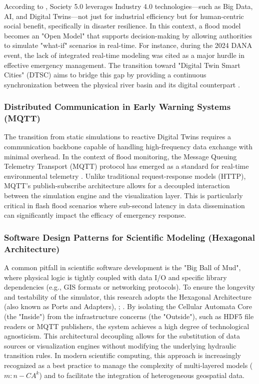 According to \cite{FonsecaiCasas2026}, Society 5.0 leverages Industry 4.0 technologies—such as Big Data, AI, and Digital 
Twins—not just for industrial efficiency but for human-centric social benefit, specifically in disaster resilience. In this 
context, a flood model becomes an "Open Model" that supports decision-making by allowing authorities to simulate "what-if" 
scenarios in real-time. For instance, during the 2024 DANA event, the lack of integrated real-time modeling was cited as a 
major hurdle in effective emergency management. The transition toward "Digital Twin Smart Cities" (DTSC) 
aims to bridge this gap by providing a continuous synchronization between the physical river basin and its digital counterpart 
\parencite{Mazzetto2024}.


\subsubsection{Distributed Communication in Early Warning Systems (MQTT)}

The transition from static simulations to reactive Digital Twins requires a communication backbone capable of handling high-frequency 
data exchange with minimal overhead. In the context of flood monitoring, the Message Queuing Telemetry Transport (MQTT) protocol has 
emerged as a standard for real-time environmental telemetry \parencite{Dionsio2025}. Unlike traditional request-response models (HTTP), 
MQTT's publish-subscribe architecture allows for a decoupled interaction between the simulation engine and the visualization layer. 
This is particularly critical in flash flood scenarios where sub-second latency in data dissemination can significantly impact the 
efficacy of emergency response.


\subsubsection{Software Design Patterns for Scientific Modeling (Hexagonal Architecture)}

A common pitfall in scientific software development is the "Big Ball of Mud", where physical logic is tightly coupled with data I/O and 
specific library dependencies (e.g., GIS formats or networking protocols). To ensure the longevity and testability of the simulator, 
this research adopts the Hexagonal Architecture (also known as Ports and Adapters), \cite{Cockburn2005}; \cite{Nunkesser2022}. By isolating the Cellular Automata Core 
(the "Inside") from the infrastructure concerns (the "Outside"), such as HDF5 file readers or MQTT publishers, the system achieves a 
high degree of technological agnosticism. This architectural decoupling allows for the substitution of data sources or visualization 
engines without modifying the underlying hydraulic transition rules. In modern scientific computing, this approach is increasingly 
recognized as a best practice to manage the complexity of multi-layered models ($m:n-CA^k$) and to facilitate the integration of 
heterogeneous geospatial data.


